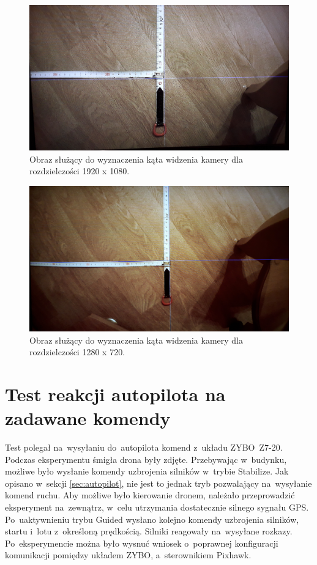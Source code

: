 \begin{figure}[h]
	\centering
	\includegraphics[width=\textwidth]{1080p.jpg}
	\caption{Obraz służący do wyznaczenia kąta widzenia kamery dla rozdzielczości 1920 x 1080.}
	\label{fig:1080p}
\end{figure}
\begin{figure}[h]
	\centering
	\includegraphics[width=\textwidth]{720p.jpg}
	\caption{Obraz służący do wyznaczenia kąta widzenia kamery dla rozdzielczości 1280 x 720.}
	\label{fig:720p}
\end{figure}

\fi
\section{Test reakcji autopilota na zadawane komendy}
\label{sec:test_autopilota}
Test polegał na~wysyłaniu do~autopilota komend z~układu ZYBO~Z7-20. Podczas eksperymentu śmigła drona były zdjęte. Przebywając w~budynku, możliwe było wysłanie komendy uzbrojenia silników w~trybie Stabilize. Jak opisano w~sekcji \ref{sec:autopilot}, nie jest to jednak tryb pozwalający na~wysyłanie komend ruchu. Aby możliwe było kierowanie dronem, należało przeprowadzić eksperyment na~zewnątrz, w~celu utrzymania dostatecznie silnego sygnału GPS. Po~uaktywnieniu trybu Guided wysłano kolejno komendy uzbrojenia silników, startu i~lotu z~określoną prędkością. Silniki reagowały na~wysyłane rozkazy.\\
Po~eksperymencie można było wysnuć wniosek o~poprawnej konfiguracji komunikacji pomiędzy układem ZYBO, a~sterownikiem Pixhawk.

